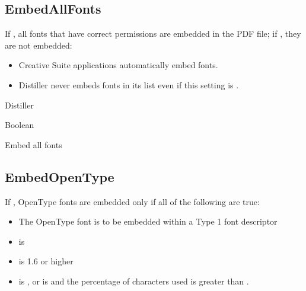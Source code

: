 \documentclass[letterpaper,12pt,english,openany,oneside]{sphinxmanual}
\begin{document}
\subsection{EmbedAllFonts}
\label{\detokenize{PDF_Create_CommonSettings:embedallfonts}}
If  , all fonts that have correct permissions are embedded in the PDF file; if  , they are not embedded:
\begin{itemize}
\item {} 
Creative Suite applications automatically embed fonts.

\item {} 
Distiller never embeds fonts in its  list even if this setting is  .

\end{itemize}
\label{\detokenize{PDF_Create_CommonSettings:supported-by-69}}

Distiller

 Boolean

\label{\detokenize{PDF_Create_CommonSettings:ui-name-55}}

Embed all fonts

\label{\detokenize{PDF_Create_CommonSettings:default-value-65}}

\begin{sphinxVerbatim}[commandchars=\\\{\}]
\end{sphinxVerbatim}


\subsection{EmbedOpenType}
\label{\detokenize{PDF_Create_CommonSettings:embedopentype}}
If  , OpenType fonts are embedded only if all of the following are true:
\begin{itemize}
\item {} 
The OpenType font is to be embedded within a Type 1 font descriptor

\item {} 
 is 

\item {} 
 is 1.6 or higher

\item {} 
 is  , or  is  and the percentage of characters used is greater than  .

\end{itemize}
\label{\detokenize{PDF_Create_CommonSettings:supported-by-70}}
\end{document}
